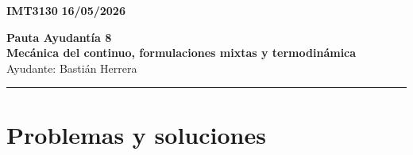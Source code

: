 \documentclass[11pt]{article}
\begin{document}
    \begin{flushleft}
        \small
        \vspace{1pt}
        \textbf{IMT3130} \hfill
        \textbf{16/05/2026}
    \end{flushleft}
    \begin{center}
        \LARGE\textbf{Pauta Ayudantía 8}\\
        \vspace{3pt}
        \normalsize\textbf{Mecánica del continuo, formulaciones mixtas y termodinámica}\\
        \normalsize Ayudante: Bastián Herrera 
        \rule{\textwidth}{0.05mm}
    \end{center}

\section*{Problemas y soluciones}
\end{document}
